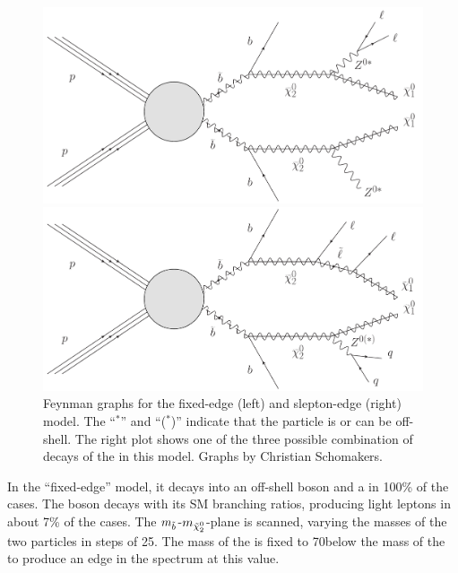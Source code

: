 \begin{figure}[htbp]
\centering
\begin{minipage}[t]{0.49\textwidth}
  \includegraphics[width=\textwidth]{plots/THEO/Feynman_graph_T6bblledgeZ.pdf}
\end{minipage}
\begin{minipage}[t]{0.49\textwidth}
\includegraphics[width=\textwidth]{plots/THEO/Feynman_graph_T6bbslepton.pdf}
\end{minipage}
\caption{Feynman graphs for the fixed-edge (left) and slepton-edge (right) model. The ``$^{*}$'' and ``($^{*}$)'' indicate that the particle is or can be off-shell. The right plot shows one of the three possible combination of decays of the \secondchi in this model. Graphs by Christian Schomakers.}
\label{fig:sigFeyn}
\end{figure}

 In the ``fixed-edge'' model, it decays into an off-shell \Z boson and a \firstchi in 100\% of the cases. The \Z boson decays with its SM branching ratios, producing light leptons in about 7\% of the cases. The $m_{\tilde{b}}$-$m_{{\tilde{\chi}^0_2}}$-plane is scanned, varying the masses of the two particles in steps of 25\GeV. The mass of the \firstchi is fixed to 70\GeV below the mass of the \secondchi to produce an edge in the \mll spectrum at this value.


